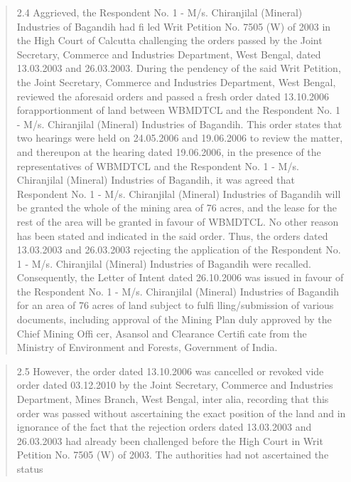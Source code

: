 \documentclass[12pt,a4paper]{article}
\newenvironment{judgequote}
  {\begin{quote}\small}
  {\end{quote}}
\begin{document}
\begin{judgequote}
2.4 Aggrieved, the Respondent No. 1 - M/s. Chiranjilal (Mineral)
Industries of Bagandih had fi led Writ Petition No. 7505 (W) of 2003 in the
High Court of Calcutta challenging the orders passed by the Joint Secretary,
Commerce and Industries Department, West Bengal, dated 13.03.2003 and
26.03.2003. During the pendency of the said Writ Petition, the Joint Secretary,
Commerce and Industries Department, West Bengal, reviewed the aforesaid
orders and passed a fresh order dated 13.10.2006 forapportionment of land
between WBMDTCL and the Respondent No. 1 - M/s. Chiranjilal (Mineral)
Industries of Bagandih. This order states that two hearings were held on
24.05.2006 and 19.06.2006 to review the matter, and thereupon at the hearing
dated 19.06.2006, in the presence of the representatives of WBMDTCL and
the Respondent No. 1 - M/s. Chiranjilal (Mineral) Industries of Bagandih,
it was agreed that Respondent No. 1 - M/s. Chiranjilal (Mineral) Industries
of Bagandih will be granted the whole of the mining area of 76 acres, and
the lease for the rest of the area will be granted in favour of WBMDTCL.
No other reason has been stated and indicated in the said order. Thus, the
orders dated 13.03.2003 and 26.03.2003 rejecting the application of the
Respondent No. 1 - M/s. Chiranjilal (Mineral) Industries of Bagandih were
recalled. Consequently, the Letter of Intent dated 26.10.2006 was issued in
favour of the Respondent No. 1 - M/s. Chiranjilal (Mineral) Industries of
Bagandih for an area of 76 acres of land subject to fulfi lling/submission of
various documents, including approval of the Mining Plan duly approved
by the Chief Mining Offi cer, Asansol and Clearance Certifi cate from the
Ministry of Environment and Forests, Government of India.
\end{judgequote}

\begin{judgequote}
2.5 However, the order dated 13.10.2006 was cancelled or revoked
vide order dated 03.12.2010 by the Joint Secretary, Commerce and Industries
Department, Mines Branch, West Bengal, inter alia, recording that this
order was passed without ascertaining the exact position of the land and
in ignorance of the fact that the rejection orders dated 13.03.2003 and
26.03.2003 had already been challenged before the High Court in Writ
Petition No. 7505 (W) of 2003. The authorities had not ascertained the status
\end{judgequote}


\end{document}
